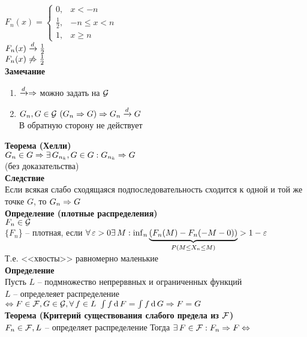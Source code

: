\documentclass[12pt]{article}
\begin{document}
$F_n(x) = \left\{\begin{array}{cc}
    0, & x < -n\\
    \frac12, & -n \leq x < n\\
    1, & x \geq n
\end{array}\right.$\\
$F_n(x) \xrto{d} \frac12$\\
$F_n(x) \not \Rto \frac12$\\
\textbf{Замечание}
\begin{enumerate}
    \item $\xrto{d} \Rto$ можно задать на $\mc G$
    \item $G_n, G \in \mc G\ (G_n \Rto G) \Rto G_n \xrto{d} G$\\
    В обратную сторону не действует
\end{enumerate}
\textbf{Теорема (Хелли)}\\
$G_n \in G \Rto \ex G_{n_k}, G \in G: G_{n_k} \Rto G$\\
(без доказательства)\\
\textbf{Следствие}\\
Если всякая слабо сходящаяся подпоследовательность сходится к одной и той же точке $G$, то $G_n \Rto G$\\
\textbf{Определение (плотные распределения)}\\
$F_n \in \mc G$\\
$\{F_n$\} -- плотная, если $\fall \eps > 0\ex M: \inf_n \ub{P(M\leq X_n \leq M)}{(F_n(M) - F_n(-M-0))} > 1-\eps$\\
Т.е. <<хвосты>> равномерно маленькие\\
\textbf{Определение}\\
Пусть $L$ -- подмножество непрерввных и ограниченных функций\\
$L$ -- определеяет распределение $\LRto F \in \mc F, G \in \mc G, \fall f \in L\ \int f\df F = \int f \df G \Rto F = G$\\
\textbf{Теорема (Критерий существования слабого предела из $\mc F$)}\\
$F_n \in \mc F, L$ -- определяет распределение
Тогда $\ex F \in \mc F: F_n \Rto F \LRto$
\end{document}
